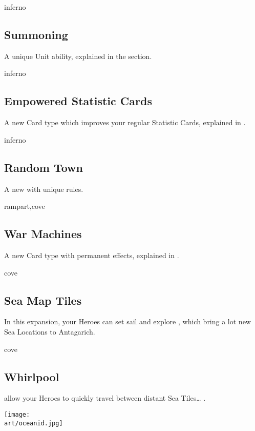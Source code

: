 \begin{multicols*}{2}
\vspace*{1em}
\begin{expansion}{inferno}
    \subsection*{Summoning}
    A unique Unit ability, explained in the  section.
\end{expansion}

\vspace*{1em}
\begin{expansion}{inferno}
    \subsection*{Empowered Statistic Cards}
    A new Card type which improves your regular Statistic Cards, explained in .
\end{expansion}

\vspace*{1em}
\begin{expansion}{inferno}
    \subsection*{Random Town}
    A new  with unique rules.
\end{expansion}

\columnbreak
\begin{expansion}{rampart,cove}
\subsection*{War Machines}
  A new Card type with permanent effects, explained in .
\end{expansion}

\vspace*{1em}
\begin{expansion}{cove}
   \subsection*{Sea Map Tiles}
   In this expansion, your Heroes can set sail and explore , which bring a lot new Sea Locations to Antagarich.
\end{expansion}

\vspace*{1em}
\begin{expansion}{cove}
    \subsection*{Whirlpool}
     allow your Heroes to quickly travel between distant Sea Tiles… .
\end{expansion}

\vspace*{\fill}
\columnbreak

\texttt{[image: \\art/oceanid.jpg]}
\end{multicols*}

